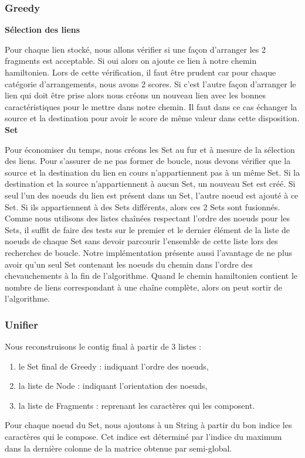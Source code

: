 \documentclass{article}
\begin{document}
\subsubsection{Greedy}

\textbf{Sélection des liens}

\vspace{0.3mm}
Pour chaque lien stocké, nous allons vérifier si une façon d'arranger les 2 fragments est acceptable. Si oui alors on ajoute ce lien à notre chemin hamiltonien.
Lors de cette vérification, il faut être prudent car pour chaque catégorie d'arrangements, nous avons 2 scores. Si c'est l'autre façon d'arranger le lien qui doit être prise alors nous créons un nouveau lien avec les bonnes caractéristiques pour le mettre dans notre chemin. Il faut dans ce cas échanger la source et la destination pour avoir le score de même valeur dans cette disposition.\\ 

\textbf{Set}

\vspace{0.3mm}
Pour économiser du temps, nous créons les Set au fur et à mesure de la sélection des liens. Pour s'assurer de ne pas former de boucle, nous devons vérifier que la source et la destination du lien en cours n'appartiennent pas à un même Set. Si la destination et la source n'appartiennent à aucun Set, un nouveau Set est créé. Si seul l'un des noeuds du lien est présent dans un Set, l'autre  noeud est ajouté à ce Set. Si ils appartiennent à des Sets différents, alors ces 2 Sets sont fusionnés. \\ 

Comme nous utilisons des listes chaînées respectant l'ordre des noeuds pour les Sets, il suffit de faire des tests sur le premier et le dernier élément de la liste de noeuds de chaque Set sans devoir parcourir l'ensemble de cette liste lors des recherches de boucle. Notre implémentation présente aussi l'avantage de ne plus avoir qu'un seul Set contenant les noeuds du chemin dans l'ordre des chevauchements à la fin de l'algorithme. Quand le chemin hamiltonien contient le nombre de liens correspondant à une chaîne complète, alors on peut sortir de l'algorithme.

\subsubsection{Unifier} 
Nous reconstruisons le contig final à partir de 3 listes :
\begin{enumerate}
\item le Set final de Greedy : indiquant l'ordre des noeuds,
\item la liste de Node : indiquant l'orientation des noeuds,
\item la liste de Fragments : reprenant les caractères qui les composent.
\end{enumerate} 
Pour chaque noeud du Set, nous ajoutons à un String à partir du bon indice les caractères qui le compose. Cet indice est déterminé par l'indice du maximum dans la dernière colonne de la matrice obtenue par semi-global.\\
\end{document}
